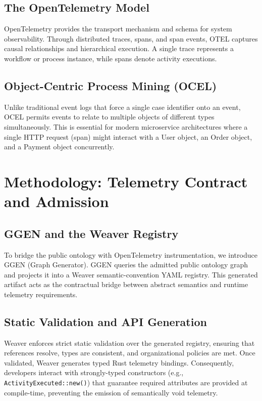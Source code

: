 \documentclass[12pt,a4paper,oneside]{book}
\begin{document}
\section{The OpenTelemetry Model}
OpenTelemetry provides the transport mechanism and schema for system observability. Through distributed traces, spans, and span events, OTEL captures causal relationships and hierarchical execution. A single trace represents a workflow or process instance, while spans denote activity executions.

\section{Object-Centric Process Mining (OCEL)}
Unlike traditional event logs that force a single case identifier onto an event, OCEL permits events to relate to multiple objects of different types simultaneously. This is essential for modern microservice architectures where a single HTTP request (span) might interact with a User object, an Order object, and a Payment object concurrently.

\chapter{Methodology: Telemetry Contract and Admission}

\section{GGEN and the Weaver Registry}
To bridge the public ontology with OpenTelemetry instrumentation, we introduce GGEN (Graph Generator). GGEN queries the admitted public ontology graph and projects it into a Weaver semantic-convention YAML registry. This generated artifact acts as the contractual bridge between abstract semantics and runtime telemetry requirements.

\section{Static Validation and API Generation}
Weaver enforces strict static validation over the generated registry, ensuring that references resolve, types are consistent, and organizational policies are met. Once validated, Weaver generates typed Rust telemetry bindings. Consequently, developers interact with strongly-typed constructors (e.g., \texttt{ActivityExecuted::new()}) that guarantee required attributes are provided at compile-time, preventing the emission of semantically void telemetry.
\end{document}
